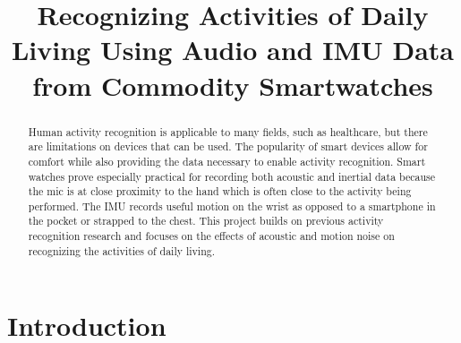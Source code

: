 \documentclass[conference]{IEEEtran}
\begin{document}
	
	\title{Recognizing Activities of Daily Living Using Audio and IMU Data from Commodity Smartwatches
	}
	
	\author{
		
		\and
		
		\and
	}
	
	\maketitle
	
	\begin{abstract}
		Human activity recognition is applicable to many fields, such as healthcare, but there are limitations on devices that can be used.
		The popularity of smart devices allow for comfort while also providing the data necessary to enable activity recognition.
		Smart watches prove especially practical for recording both acoustic and inertial data because the mic is at close proximity to the hand which is often close to the activity being performed. The IMU records useful motion on the wrist as opposed to a smartphone in the pocket or strapped to the chest.
		This project builds on previous activity recognition research and focuses on the effects of acoustic and motion noise on recognizing the activities of daily living.
		
	\end{abstract}
	
	
	\section{Introduction}
	
\end{document}
